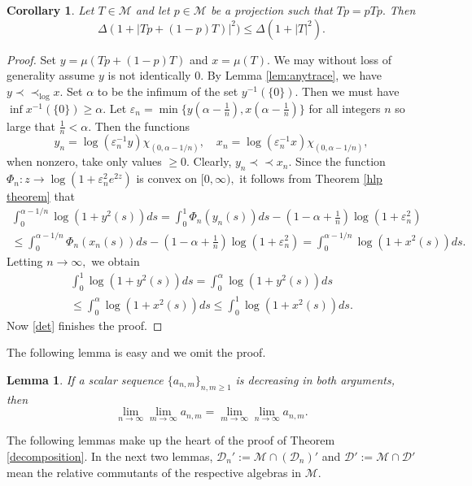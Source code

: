 \documentclass{amsart}
\theoremstyle{plain}
\newtheorem{lem}[thm]{Lemma}
\newtheorem{cor}[thm]{Corollary}
\theoremstyle{remark}
\begin{document}
\begin{cor}\label{standard} Let $T\in\mathcal{M}$ and let $p\in\mathcal{M}$ be a projection such that $Tp=pTp.$ Then
$$\Delta(1+\big|Tp+(1-p)T)\big|^2)\le\Delta(1+|T|^2).$$
\end{cor}
\begin{proof} Set $y=\mu(Tp+(1-p)T)$ and $x=\mu(T).$ We may without loss of generality assume $y$ is not identically $0.$ By Lemma \ref{lem:anytrace}, we have $y\prec\prec_{\log}x.$ Set $\alpha$ to be the infimum of the set $y^{-1}(\{0\}).$ Then we must have $\inf x^{-1}(\{0\})\ge\alpha.$ Let $\varepsilon_n=\min\{y(\alpha-\frac1n),x(\alpha-\frac1n)\}$ for all integers $n$ so large that $\frac1n<\alpha.$ Then the functions
$$y_n=\log(\varepsilon_n^{-1}y)\chi_{(0,\alpha-1/n)},\quad x_n=\log(\varepsilon_n^{-1}x)\chi_{(0,\alpha-1/n)},$$
when nonzero, take only values $\ge0.$ Clearly, $y_n\prec\prec x_n.$ Since the function $\Phi_n:z\to\log(1+\varepsilon_n^2e^{2z})$ is convex on $[0,\infty),$ it follows from Theorem \ref{hlp theorem} that
\begin{multline*}
\int_0^{\alpha-1/n}\log(1+y^2(s))ds=\int_0^1\Phi_n(y_n(s))ds-(1-\alpha+\frac1n)\log(1+\varepsilon_n^2)\\
\leq\int_0^{\alpha-1/n}\Phi_n(x_n(s))ds-(1-\alpha+\frac1n)\log(1+\varepsilon_n^2)=\int_0^{\alpha-1/n}\log(1+x^2(s))ds.
\end{multline*}
Letting $n\to\infty,$ we obtain
\begin{multline*}
\int_0^1\log(1+y^2(s))ds=\int_0^{\alpha}\log(1+y^2(s))ds \\
\leq\int_0^{\alpha}\log(1+x^2(s))ds\leq\int_0^1\log(1+x^2(s))ds.
\end{multline*}
Now \eqref{det} finishes the proof.
\end{proof}

The following lemma is easy and we omit the proof.

\begin{lem}\label{monotone triv} If a scalar sequence $\{a_{n,m}\}_{n,m\geq1}$ is decreasing in both arguments, then
$$\lim_{n\to\infty}\lim_{m\to\infty}a_{n,m}=\lim_{m\to\infty}\lim_{n\to\infty}a_{n,m}.$$
\end{lem}

The following lemmas make up the heart of the proof of Theorem \ref{decomposition}.
In the next two lemmas, $\mathcal{D}_n':=\mathcal{M}\cap(\mathcal{D}_n)'$
and $\mathcal{D}':=\mathcal{M}\cap\mathcal{D}'$ mean the relative commutants of the respective algebras in $\mathcal{M}$.
\end{document}

